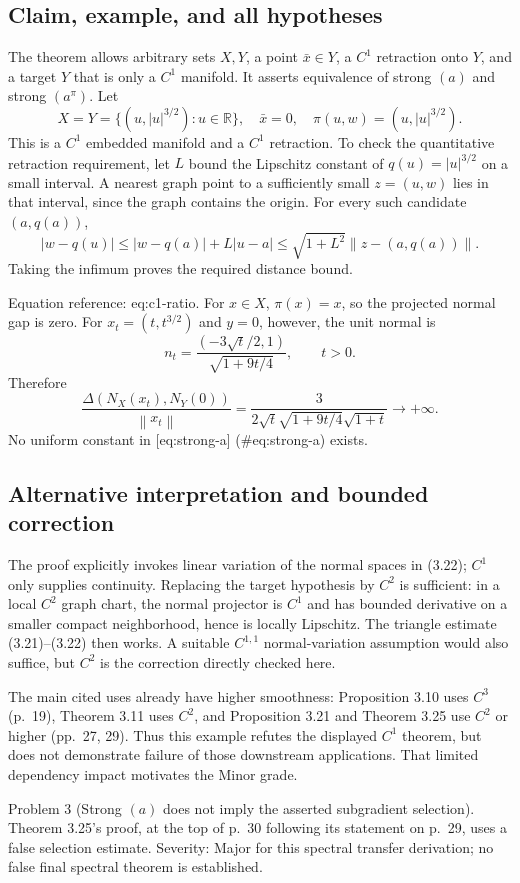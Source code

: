 \documentclass[10pt]{article}
\begin{document}
\subsection*{Claim, example, and all hypotheses}
The theorem allows arbitrary sets \(X,Y\), a point \(\bar x\in Y\), a \(C^1\) retraction onto \(Y\), and a target \(Y\) that is only a \(C^1\) manifold. It asserts equivalence of strong \((a)\) and strong \((a^\pi)\). Let \[X=Y=\{(u,|u|^{3/2}):u\in\mathbb R\},\quad \bar x=0,\quad
 \pi(u,w)=(u,|u|^{3/2}).\] This is a \(C^1\) embedded manifold and a \(C^1\) retraction. To check the quantitative retraction requirement, let \(L\) bound the Lipschitz constant of \(q(u)=|u|^{3/2}\) on a small interval. A nearest graph point to a sufficiently small \(z=(u,w)\) lies in that interval, since the graph contains the origin. For every such candidate \((a,q(a))\), \[|w-q(u)|\le |w-q(a)|+L|u-a|
 \le\sqrt{1+L^2}\left\|z-(a,q(a))\right\|.\] Taking the infimum proves the required distance bound.\par
Equation reference: eq:c1-ratio. For \(x\in X\), \(\pi(x)=x\), so the projected normal gap is zero. For \(x_t=(t,t^{3/2})\) and \(y=0\), however, the unit normal is \[n_t=\frac{(-3\sqrt t/2,1)}{\sqrt{1+9t/4}},\qquad t>0.\] Therefore \[
 \frac{\Delta(N_X(x_t),N_Y(0))}{\left\|x_t\right\|}
 =\frac{3}{2\sqrt t\sqrt{1+9t/4}\sqrt{1+t}}
 \longrightarrow+\infty .\] No uniform constant in [eq:strong-a] (\#eq:strong-a) exists.\par
\subsection*{Alternative interpretation and bounded correction}
The proof explicitly invokes linear variation of the normal spaces in (3.22); \(C^1\) only supplies continuity. Replacing the target hypothesis by \(C^2\) is sufficient: in a local \(C^2\) graph chart, the normal projector is \(C^1\) and has bounded derivative on a smaller compact neighborhood, hence is locally Lipschitz. The triangle estimate (3.21)–(3.22) then works. A suitable \(C^{1,1}\) normal-variation assumption would also suffice, but \(C^2\) is the correction directly checked here.\par
The main cited uses already have higher smoothness: Proposition 3.10 uses \(C^3\) (p. 19), Theorem 3.11 uses \(C^2\), and Proposition 3.21 and Theorem 3.25 use \(C^2\) or higher (pp. 27, 29). Thus this example refutes the displayed \(C^1\) theorem, but does not demonstrate failure of those downstream applications. That limited dependency impact motivates the Minor grade.\par
Problem 3 (Strong \((a)\) does not imply the asserted subgradient selection).  Theorem 3.25’s proof, at the top of p. 30 following its statement on p. 29, uses a false selection estimate. Severity: Major for this spectral transfer derivation; no false final spectral theorem is established.\par
\end{document}

